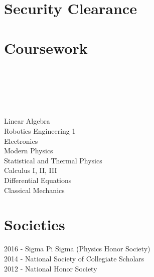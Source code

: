 \documentclass[]{deedy-resume-openfont}
\begin{document}
\begin{minipage}[t]{0.33\textwidth}

\section{Security Clearance}
\sectionsep


\section{Coursework}
 \\
 \\
 \\
 \\
 \\
Linear Algebra \\
Robotics Engineering 1 \\
Electronics \\
Modern Physics \\
Statistical and Thermal Physics \\
Calculus I, II, III \\
Differential Equations \\
Classical Mechanics \\
\sectionsep


\section{Societies} 
2016 - Sigma Pi Sigma (Physics Honor Society)\\
2014 - National Society of Collegiate Scholars\\
2012 - National Honor Society\\
\sectionsep

%
%

\end{minipage} 
\hfill
\end{document}
